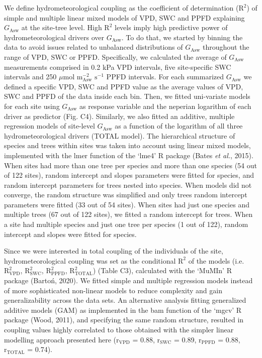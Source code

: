 \documentclass[11pt,twoside]{reedthesis}
\begin{document}
We define hydrometeorological coupling as the coefficient of
determination (\(\text{R}^2\)) of simple and multiple linear mixed
models of VPD, SWC and PPFD explaining \(G_{\text{Asw}}\) at the
site-tree level. High \(\text{R}^2\) levels imply high predictive power
of hydrometeorological drivers over \(G_{\text{Asw}}\). To do that, we
started by binning the data to avoid issues related to unbalanced
distributions of \(G_{\text{Asw}}\) throughout the range of VPD, SWC or
PPFD. Specifically, we calculated the average of \(G_{\text{Asw}}\)
measurements comprised in 0.2 kPa VPD intervals, five site-specific SWC
intervals and 250 \(\mu\)mol \(\text{m}^{-2}_{\text{Asw}}\)
\(\text{s}^{-1}\) PPFD intervals. For each summarized \(G_{\text{Asw}}\)
we defined a specific VPD, SWC and PPFD value as the average values of
VPD, SWC and PPFD of the data inside each bin. Then, we fitted
uni-variate models for each site using \(G_{\text{Asw}}\) as response
variable and the neperian logarithm of each driver as predictor (Fig.
C4). Similarly, we also fitted an additive, multiple regression models
of site-level \(G_{\text{Asw}}\) as a function of the logarithm of all
three hydrometeorological drivers (TOTAL model). The hierarchical
structure of species and trees within sites was taken into account using
linear mixed models, implemented with the lmer function of the `lme4' R
package (Bates \emph{et al.}, 2015). When sites had more than one tree
per species and more than one species (54 out of 122 sites), random
intercept and slopes parameters were fitted for species, and random
intercept parameters for trees nested into species. When models did not
converge, the random structure was simplified and only trees random
intercept parameters were fitted (33 out of 54 sites). When sites had
just one species and multiple trees (67 out of 122 sites), we fitted a
random intercept for trees. When a site had multiple species and just
one tree per species (1 out of 122), random intercept and slopes were
fitted for species.\par

Since we were interested in total coupling of the individuals of the
site, hydrometeorological coupling was set as the conditional
\(\text{R}^2\) of the models (i.e. \(\text{R}^2_{\text{VPD}}\),
\(\text{R}^2_{\text{SWC}}\), \(\text{R}^2_{\text{PPFD}}\),
\(\text{R}^2_{\text{TOTAL}}\)) (Table C3), calculated with the `MuMIn' R
package (Bartoń, 2020). We fitted simple and multiple regression models
instead of more sophisticated non-linear models to reduce complexity and
gain generalizability across the data sets. An alternative analysis
fitting generalized additive models (GAM) as implemented in the bam
function of the `mgcv' R package (Wood, 2011), and specifying the same
random structure, resulted in coupling values highly correlated to those
obtained with the simpler linear modelling approach presented here
(\(\text{r}_{\text{VPD}}\) = 0.88, \(\text{r}_{\text{SWC}}\) = 0.89,
\(\text{r}_{\text{PPFD}}\) = 0.88, \(\text{r}_{\text{TOTAL}}\) =
0.74).\par
\end{document}

